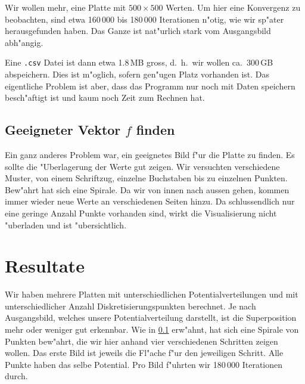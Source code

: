 \begin{refsection}
\begin{beispiel}
Wir wollen mehr, eine Platte mit $500 \times 500$ Werten. Um hier
eine Konvergenz zu beobachten, sind etwa 160\,000 bis 180\,000
Iterationen n"otig, wie wir sp"ater herausgefunden haben. Das Ganze
ist nat"urlich stark vom Ausgangsbild abh"angig.

Eine \texttt{.csv} Datei ist dann etwa 1.8\,MB gross, d.~h.~wir wollen ca.~300\,GB
abspeichern. Dies ist m"oglich, sofern gen"ugen Platz vorhanden
ist. Das eigentliche  Problem ist aber, dass das Programm nur noch
mit Daten speichern besch"aftigt ist und kaum noch Zeit zum Rechnen
hat.
\end{beispiel}
	
\subsection{Geeigneter Vektor $f$ finden}\label{sec:geeignetesF}

Ein ganz anderes Problem war, ein geeignetes Bild f"ur die Platte zu finden.
Es sollte die "Uberlagerung der Werte gut zeigen. Wir versuchten
verschiedene Muster, von einem Schriftzug, einzelne Buchstaben bis
zu einzelnen Punkten. Bew"ahrt hat sich eine Spirale. Da wir von
innen nach aussen gehen, kommen immer wieder neue Werte an verschiedenen
Seiten hinzu. Da schlussendlich nur eine geringe Anzahl Punkte
vorhanden sind, wirkt die Visualisierung nicht "uberladen und ist
"ubersichtlich.
		
\section{Resultate}

Wir haben mehrere Platten mit unterschiedlichen Potentialverteilungen
und mit unterschiedlicher Anzahl Diskretisierungspunkten berechnet.
Je nach Ausgangsbild, welches unsere Potentialverteilung darstellt,
ist die Superposition mehr oder weniger gut erkennbar. Wie in
\ref{sec:geeignetesF} erw"ahnt, hat sich eine Spirale von Punkten
bew"ahrt, die wir hier anhand vier verschiedenen Schritten zeigen
wollen. Das erste Bild ist jeweils die Fl"ache f"ur den jeweiligen
Schritt. Alle Punkte haben das selbe Potential. Pro Bild f"uhrten
wir 180\,000 Iterationen durch.


\end{refsection}
